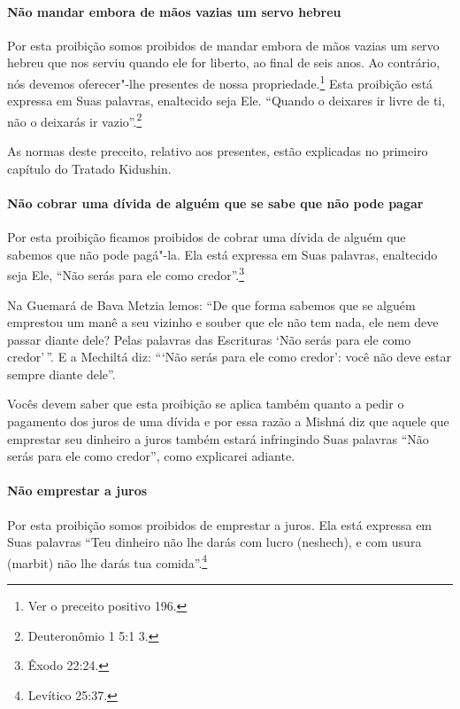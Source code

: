 \begin{multicols}{2}
\paragraph{Não mandar embora de mãos vazias um servo hebreu}

Por esta proibição somos proibidos de mandar embora de mãos vazias um
servo hebreu que nos serviu quando ele for liberto, ao final de seis
anos. Ao contrário, nós devemos oferecer"-lhe presentes de nossa
propriedade.\footnote{Ver o preceito positivo 196.} Esta proibição está expressa em Suas
palavras, enaltecido seja Ele. ``Quando o deixares ir livre de ti, não
o deixarás ir vazio''.\footnote{Deuteronômio 1 5:1 3.}

As normas deste preceito, relativo aos presentes, estão explicadas no
primeiro capítulo do Tratado Kidushin\starr.

\paragraph{Não cobrar uma dívida de alguém que se sabe que não pode pagar}

Por esta proibição ficamos proibidos de cobrar uma dívida de alguém que
sabemos que não pode pagá"-la. Ela está expressa em Suas palavras,
enaltecido seja Ele, ``Não serás para ele como credor''.\footnote{Êxodo 22:24.}

Na Guemará\starr{} de Bava Metzia\starr{} lemos: ``De que forma sabemos que se alguém
emprestou um manê\starr{} a seu vizinho e souber que
ele não tem nada, ele nem deve passar diante dele? Pelas palavras das
Escrituras `Não serás para ele como credor'\,''. E a Mechiltá\starr{} diz: ```Não
serás para ele como credor': você não deve estar sempre diante dele''.

Vocês devem saber que esta proibição se aplica também quanto a pedir o
pagamento dos juros de uma dívida e por essa razão a Mishná\starr{} diz que
aquele que emprestar seu dinheiro a juros também estará infringindo Suas
palavras ``Não serás para ele como credor'', como explicarei adiante.

\paragraph{Não emprestar a juros}

Por esta proibição somos proibidos de emprestar a juros. Ela está
expressa em Suas palavras ``Teu dinheiro não lhe darás com lucro
(neshech\starr), e com usura (marbit\starr) não lhe darás tua comida''.\footnote{Levítico
25:37.}


\end{multicols}
